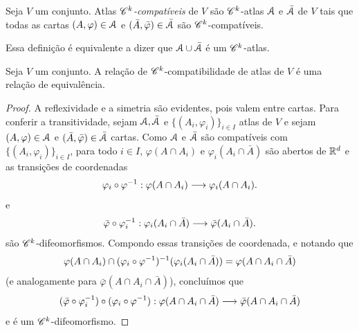 \begin{defi}
Seja $V$ um conjunto. Atlas \emph{$\mathscr{C}^k$-compatíveis} de $V$ são $\mathscr{C}^k$-atlas $\mathcal{A}$ e $\bar{\mathcal{A}}$ de $V$ tais que todas as cartas $(A,\varphi) \in \mathcal{A}$ e $(\bar A,\bar\varphi) \in \bar {\mathcal{A}}$ são $\mathscr{C}^k$-compatíveis.
\end{defi}

Essa definição é equivalente a dizer que $\mathcal{A} \cup \bar {\mathcal{A}}$ é um $\mathscr{C}^k$-atlas.

\begin{prop}
Seja $V$ um conjunto. A relação de $\mathscr{C}^k$-compatibilidade de atlas de $V$ é uma relação de equivalência.
\end{prop}
\begin{proof}
A reflexividade e a simetria são evidentes, pois valem entre cartas. Para conferir a transitividade, sejam $\mathcal{A},\bar{\mathcal{A}}$ e $\{(A_i,\varphi_i)\}_{i \in I}$ atlas de $V$ e sejam $(A,\varphi) \in \mathcal{A}$ e $(\bar A,\bar\varphi) \in \bar{\mathcal{A}}$ cartas. 
Como $\mathcal{A}$ e $\bar{\mathcal{A}}$ são compatíveis com $\{(A_i,\varphi_i)\}_{i \in I}$, para todo $i \in I$, $\varphi(A \cap A_i)$ e $\varphi_i(A_i \cap \bar A)$ são abertos de $\mathbb{R}^d$ e as transições de coordenadas
	\begin{equation*}
	\varphi_i \circ \varphi^{-1}: \varphi(A \cap A_i) \longrightarrow \varphi_i(A \cap A_i).
	\end{equation*}
e
	\begin{equation*}
	\bar\varphi \circ \varphi_i^{-1}: \varphi_i(A_i \cap \bar A) \longrightarrow \bar\varphi(A_i \cap \bar A).
	\end{equation*}
são $\mathscr{C}^k$-difeomorfismos. Compondo essas transições de coordenada, e notando que
	\begin{equation*}
	\varphi(A \cap A_i) \cap (\varphi_i \circ \varphi^{-1})^{-1}(\varphi_i(A_i \cap \bar A)) = \varphi(A \cap A_i \cap \bar A)
	\end{equation*}
(e analogamente para $\bar\varphi(A \cap A_i \cap \bar A)$), concluímos que
	\begin{equation*}
	(\bar\varphi \circ \varphi_i^{-1}) \circ (\varphi_i \circ \varphi^{-1}): \varphi(A \cap A_i \cap \bar A) \longrightarrow \bar\varphi(A \cap A_i \cap \bar A)
	\end{equation*}
e é um $\mathscr{C}^k$-difeomorfismo. 


\end{proof}

